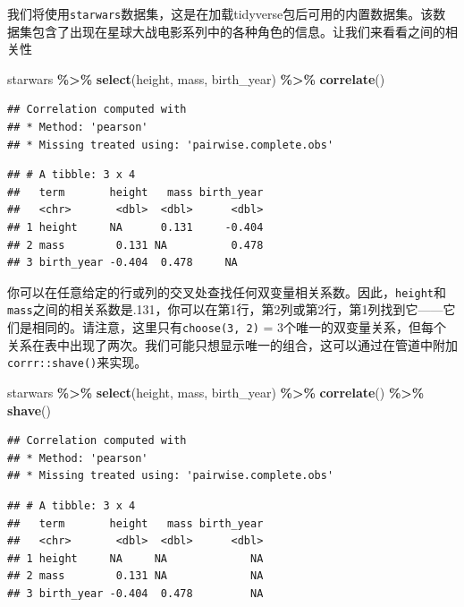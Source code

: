 \documentclass[
]{book}
\newenvironment{Shaded}{\begin{snugshade}}{\end{snugshade}}
\newcommand{\FunctionTok}[1]{\textcolor[rgb]{0.13,0.29,0.53}{\textbf{#1}}}
\newcommand{\NormalTok}[1]{#1}
\newcommand{\SpecialCharTok}[1]{\textcolor[rgb]{0.81,0.36,0.00}{\textbf{#1}}}
\begin{document}
我们将使用\texttt{starwars}数据集，这是在加载tidyverse包后可用的内置数据集。该数据集包含了出现在星球大战电影系列中的各种角色的信息。让我们来看看之间的相关性

\begin{Shaded}
\begin{Highlighting}[]
\NormalTok{starwars }\SpecialCharTok{\%\textgreater{}\%}
  \FunctionTok{select}\NormalTok{(height, mass, birth\_year) }\SpecialCharTok{\%\textgreater{}\%}
  \FunctionTok{correlate}\NormalTok{()}
\end{Highlighting}
\end{Shaded}

\begin{verbatim}
## Correlation computed with
## * Method: 'pearson'
## * Missing treated using: 'pairwise.complete.obs'
\end{verbatim}

\begin{verbatim}
## # A tibble: 3 x 4
##   term       height   mass birth_year
##   <chr>       <dbl>  <dbl>      <dbl>
## 1 height     NA      0.131     -0.404
## 2 mass        0.131 NA          0.478
## 3 birth_year -0.404  0.478     NA
\end{verbatim}

你可以在任意给定的行或列的交叉处查找任何双变量相关系数。因此，\texttt{height}和\texttt{mass}之间的相关系数是.131，你可以在第1行，第2列或第2行，第1列找到它------它们是相同的。请注意，这里只有\texttt{choose(3,\ 2)} = 3个唯一的双变量关系，但每个关系在表中出现了两次。我们可能只想显示唯一的组合，这可以通过在管道中附加\texttt{corrr::shave()}来实现。

\begin{Shaded}
\begin{Highlighting}[]
\NormalTok{starwars }\SpecialCharTok{\%\textgreater{}\%}
  \FunctionTok{select}\NormalTok{(height, mass, birth\_year) }\SpecialCharTok{\%\textgreater{}\%}
  \FunctionTok{correlate}\NormalTok{() }\SpecialCharTok{\%\textgreater{}\%}
  \FunctionTok{shave}\NormalTok{()}
\end{Highlighting}
\end{Shaded}

\begin{verbatim}
## Correlation computed with
## * Method: 'pearson'
## * Missing treated using: 'pairwise.complete.obs'
\end{verbatim}

\begin{verbatim}
## # A tibble: 3 x 4
##   term       height   mass birth_year
##   <chr>       <dbl>  <dbl>      <dbl>
## 1 height     NA     NA             NA
## 2 mass        0.131 NA             NA
## 3 birth_year -0.404  0.478         NA
\end{verbatim}
\end{document}
